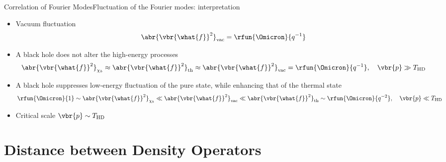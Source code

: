 \documentclass{beamer}
\begin{document}
\begin{frame}{Correlation of Fourier Modes}{Fluctuation of the Fourier 
modes: interpretation}

\begin{itemize}
	\item Vacuum fluctuation
	\begin{equation}
	\abr{\vbr{\what{f}}^2}_\text{vac} = \rfun{\Omicron}{q^{-1}}
	\end{equation}

	\item A black hole does \alert{not} alter the \alert{high}-energy
	processes
	\begin{equation}
	\abr{\vbr{\what{f}}^2}_{\chi_b} \approx
	\abr{\vbr{\what{f}}^2}_\text{th} \approx
	\abr{\vbr{\what{f}}^2}_\text{vac} = \rfun{\Omicron}{q^{-1}},
	\quad \vbr{p} \gg T_\text{HD}
	\end{equation}

	\item A black hole \alert{suppresses} low-energy fluctuation of the
	\alert{pure} state, while \alert{enhancing} that of the
	\alert{thermal} state
	\begin{equation}
	\rfun{\Omicron}{1} \sim \abr{\vbr{\what{f}}^2}_{\chi_b} \ll
	\abr{\vbr{\what{f}}^2}_\text{vac} \ll
	\abr{\vbr{\what{f}}^2}_\text{th} \sim \rfun{\Omicron}{q^{-2}},
	\quad \vbr{p} \ll T_\text{HD}
	\end{equation}
	\item Critical scale $\vbr{p} \sim T_\text{HD}$
\end{itemize}

\end{frame}

\section{Distance between Density Operators}
\end{document}
